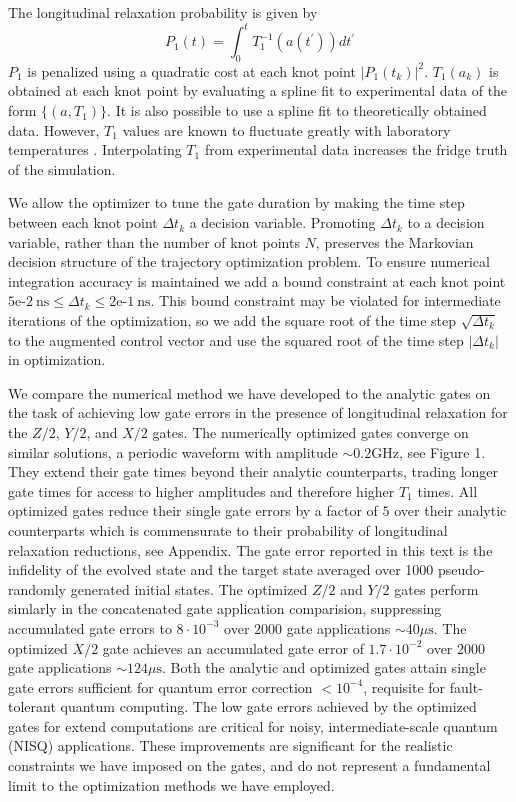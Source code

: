 \documentclass[
  amsfonts,
  amsmath,
  tbtags,
  amssymb,
  aps,
  nobibnotes,
  twocolumn,
  superscriptaddress,
]{revtex4-2}
\begin{document}
The longitudinal relaxation probability is given by
\begin{equation}
  P_{1}(t) = \int_{0}^{t} T_{1}^{-1}(a(t^{\prime})) dt^{\prime}
\end{equation}
$P_{1}$ is penalized using a quadratic cost at each knot point
${\lvert P_{1}(t_{k}) \rvert}^{2}$.
$T_{1}(a_{k})$ is obtained at each knot point by evaluating
a spline fit to experimental data of the form $\{(a, T_{1})\}$.
It is also possible to use a spline fit to theoretically obtained data.
However, $T_{1}$ values are known to fluctuate greatly
with laboratory temperatures \cite{klimov2018fluctuations}.
Interpolating $T_{1}$ from experimental data
increases the fridge truth of the simulation.

We allow the optimizer to tune the gate duration by
making the time step between each knot point $\Delta t_{k}$
a decision variable. Promoting $\Delta t_{k}$ to a decision variable, rather
than the number of knot points $N$, preserves the
Markovian decision structure of the trajectory
optimization problem. To ensure numerical
integration accuracy is maintained we add a bound
constraint at each knot point
$5\textrm{e-}2 \ \textrm{ns} \le
\Delta t_{k} \le 2\textrm{e-}1 \ \textrm{ns}$.
This bound constraint may be
violated for intermediate iterations of the optimization,
so we add the square root of the time step $\sqrt{\Delta t_{k}}$
to the augmented control vector and use the squared root
of the time step $\lvert \Delta t_{k} \rvert$ in optimization.

We compare the numerical method we have developed to the analytic gates
on the task of achieving low gate errors in the presence of longitudinal relaxation
for the $Z/2$, $Y/2$, and $X/2$ gates.
The numerically optimized gates converge on similar solutions, a periodic
waveform with amplitude $\sim 0.2 \textrm{GHz}$, see Figure 1.
They extend their gate times
beyond their analytic counterparts, trading longer gate times for access
to higher amplitudes and therefore higher $T_{1}$ times. All optimized gates reduce
their single gate errors by a factor of $5$ over
their analytic counterparts which is commensurate to their
probability of longitudinal relaxation reductions, see Appendix.
The gate error reported in this text is the infidelity
of the evolved state and the target state averaged over 1000 pseudo-randomly
generated initial states. The optimized $Z/2$ and $Y/2$ gates perform simlarly in
the concatenated gate application comparision, suppressing accumulated gate errors to $8 \cdot 10^{-3}$
over $2000$ gate applications $\sim 40 \mu\textrm{s}$. The optimized $X/2$ gate
achieves an accumulated gate error of $1.7 \cdot 10^{-2}$ over $2000$ gate applications $\sim 124 \mu\textrm{s}$.
Both the analytic and optimized gates attain single gate errors sufficient for
quantum error correction $< 10^{-4}$, requisite for fault-tolerant quantum computing.
The low gate errors achieved by the optimized gates for extend computations
are critical for noisy, intermediate-scale quantum (NISQ) applications.
These improvements are significant for the realistic constraints we have imposed
on the gates, and do not represent a fundamental limit to the optimization methods we have
employed.
\end{document}

